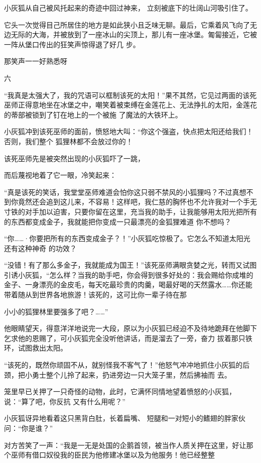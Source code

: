 \documentclass{article}
\begin{document}
小灰狐从自己被风托起来的奇迹中回过神来，
立刻被底下的壮阔山河吸引住了。 

\newpage

它头一次觉得目己所居住的地方是如此狭小且乏味无聊。最后，它乘着风飞向了无边无际的大海，并被放到了一座冰山的尖顶上，那儿有一座冰堡。匍匐接近，它被一阵从堡口传出的狂笑声惊得退了好几
步。 


那笑声一一好熟悉呀 


六 

“我真是太强大了，我的咒语可以框制该死的太阳！”果不其然，它见过两面的该死巫师正得意地坐在冰堡之中，嘲笑着被束缚在金莲花上、无法挣扎的太阳，金莲花的蒂部被锁到了钉在地上的一个被施
了魔法的大铁环上。 

小灰狐冲到该死巫师的面前，愤怒地大叫：“你这个强盗，快点把太阳还给我们！否则，我们整个
狐狸林都不会放过你的！ 

该死巫师先是被突然出现的小灰狐吓了一跳，
\newpage

而后蔑视地着了它一眼，冷笑起来： 

“真是该死的笑话，我堂堂巫师难道会怕你这只弱不禁风的小狐狸吗？不过真想不到你竟然还会追到这儿来，不容易！这样吧，我仁慈的胸怀也不允许我对一个手无寸铁的对手加以迫害，只要你留在这里，充当我的助手，让我能够用太阳光把所有的东西都变成金子，我就能把你变成一只最漂亮的金狐狸难道
你不想吗？ 

“你……·你要把所有的东西变成金子？！”小灰狐吃惊极了。它怎么不知道太阳光还有这种神奇
的功效？ 

“没错！有了那么多金子，我就能成为国王！”该死巫师满眼贪婪之光，转而又试图引诱小灰狐，“怎么样？当我的助手吧，你会得到很多好处的：我会赐给你成堆的金子、一身漂亮的金皮毛，每天吃最珍贵的肉羹，喝最好喝的天然露水……你还能带着随从到世界各地旅游！该死的，这可比你一辈子待在那

\newpage
小小的狐狸林里要强多了吧？……” 

他眼睛望天，得意洋洋地说完一大段，原以为小灰狐已经迫不及待地跪拜在他脚下乞求他的恩赐了，可小灰狐完全没听他讲话，而是溜去了一旁，奋力
拔着那只铁环，试图救出太阳。 

“该死的，既然你顽固不从，就别怪我不客气了！”他怒气冲冲地抓住小灰狐的后颈，把小勇士整个儿拎了起来，扔进旁边一只大笼子里，然后拂袖而
去。 

笼里早已关押了一只奇怪的动物，此时，它满怀同情地望着愤怒的小灰狐，说：“算了吧，你反抗
又有什么用呢？” 

小灰狐讶异地看着这只黑背白肚，长着扁嘴、
短腿和一对短小的鳍翅的胖家伙问：“你是谁？” 

对方苦笑了一声：“我是一无是处国的企鹅首领，被当作人质关押在这里，好让那个巫师有借口奴役我的臣民为他修建冰堡以及为他服务！他已经整整
\newpage
\end{document}
